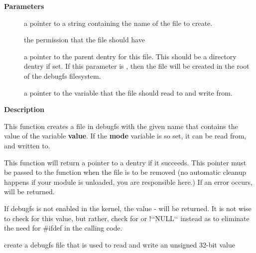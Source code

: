 \documentclass[a4paper,8pt,english]{sphinxmanual}
\begin{document}
\textbf{Parameters}
\begin{description}
\item[{}] \leavevmode
a pointer to a string containing the name of the file to create.

\item[{}] \leavevmode
the permission that the file should have

\item[{}] \leavevmode
a pointer to the parent dentry for this file.  This should be a
directory dentry if set.  If this parameter is , then the
file will be created in the root of the debugfs filesystem.

\item[{}] \leavevmode
a pointer to the variable that the file should read to and write
from.

\end{description}

\textbf{Description}

This function creates a file in debugfs with the given name that
contains the value of the variable \textbf{value}.  If the \textbf{mode} variable is so
set, it can be read from, and written to.

This function will return a pointer to a dentry if it succeeds.  This
pointer must be passed to the {\hyperref[filesystems/index:c.debugfs_remove]{\emph{}}} function when the file is
to be removed (no automatic cleanup happens if your module is unloaded,
you are responsible here.)  If an error occurs,  will be returned.

If debugfs is not enabled in the kernel, the value - will be
returned.  It is not wise to check for this value, but rather, check for
 or !{}`{}`NULL{}`{}` instead as to eliminate the need for \#ifdef in the calling
code.

\begin{fulllineitems}
\label{filesystems/index:c.debugfs_create_u32}
create a debugfs file that is used to read and write an unsigned 32-bit value

\end{fulllineitems}
\end{document}
